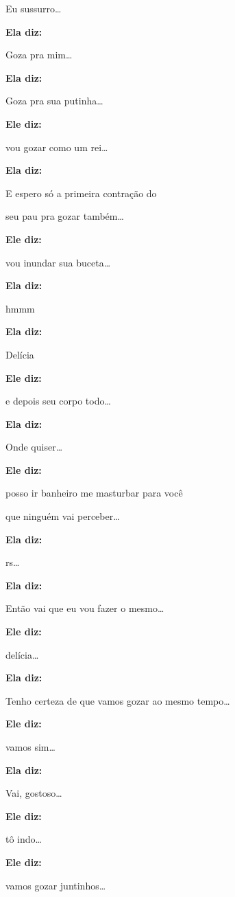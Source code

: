Eu sussurro…

\textbf{Ela diz:}

Goza pra mim…

\textbf{Ela diz:}

Goza pra sua putinha…

\textbf{Ele diz:}

vou gozar como um rei…

\textbf{Ela diz:}

E espero só a primeira contração do

seu pau pra gozar também…

\textbf{Ele diz:}

vou inundar sua buceta…

\textbf{Ela diz:}

hmmm

\textbf{Ela diz:}

Delícia

\textbf{Ele diz:}

e depois seu corpo todo…

\textbf{Ela diz:}

Onde quiser…

\textbf{Ele diz:}

posso ir banheiro me masturbar para você

que ninguém vai perceber…

\textbf{Ela diz:}

rs…

\textbf{Ela diz:}

Então vai que eu vou fazer o mesmo…

\textbf{Ele diz:}

delícia…

\textbf{Ela diz:}

Tenho certeza de que vamos gozar ao mesmo tempo…

\textbf{Ele diz:}

vamos sim…

\textbf{Ela diz:}

Vai, gostoso…

\textbf{Ele diz:}

tô indo…

\textbf{Ele diz:}

vamos gozar juntinhos…


